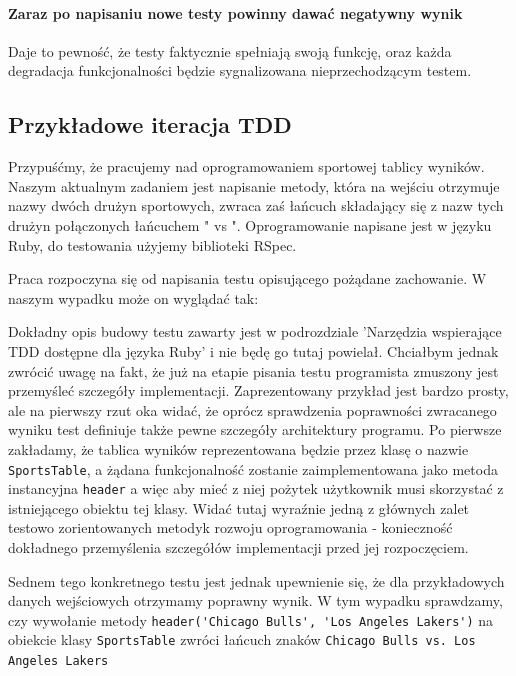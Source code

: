     \paragraph{Zaraz po napisaniu nowe testy powinny dawać negatywny wynik}
      Daje to pewność, że testy faktycznie spełniają swoją funkcję, oraz każda degradacja funkcjonalności będzie sygnalizowana nieprzechodzącym testem.
      
  \subsection{Przykładowe iteracja TDD}
    Przypuśćmy, że pracujemy nad oprogramowaniem sportowej tablicy wyników. Naszym aktualnym zadaniem jest napisanie metody, która na wejściu otrzymuje nazwy dwóch drużyn sportowych, zwraca zaś łańcuch składający się z nazw tych drużyn połączonych łańcuchem " vs ". Oprogramowanie napisane jest w języku Ruby, do testowania użyjemy biblioteki RSpec.
    
    Praca rozpoczyna się od napisania testu opisującego pożądane zachowanie. W naszym wypadku może on wyglądać tak: 
    
    

    Dokładny opis budowy testu zawarty jest w podrozdziale 'Narzędzia wspierające TDD dostępne dla języka Ruby' i nie będę go tutaj powielał. Chciałbym jednak zwrócić uwagę na fakt, że już na etapie pisania testu programista zmuszony jest przemyśleć szczegóły implementacji. Zaprezentowany przykład jest bardzo prosty, ale na pierwszy rzut oka widać, że oprócz sprawdzenia poprawności zwracanego wyniku test definiuje także pewne szczegóły architektury programu. Po pierwsze zakładamy, że tablica wyników reprezentowana będzie przez klasę o nazwie \verb+SportsTable+, a żądana funkcjonalność zostanie zaimplementowana jako metoda instancyjna \verb+header+ a więc aby mieć z niej pożytek użytkownik musi skorzystać z istniejącego obiektu tej klasy. Widać tutaj wyraźnie jedną z głównych zalet testowo zorientowanych metodyk rozwoju oprogramowania - konieczność dokładnego przemyślenia szczegółów implementacji przed jej rozpoczęciem.
    
    Sednem tego konkretnego testu jest jednak upewnienie się, że dla przykładowych danych wejściowych otrzymamy poprawny wynik. W tym wypadku sprawdzamy, czy wywołanie metody \verb+header('Chicago Bulls', 'Los Angeles Lakers')+ na obiekcie klasy \verb+SportsTable+ zwróci łańcuch znaków \verb+Chicago Bulls vs. Los Angeles Lakers+
    
